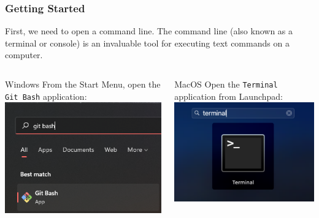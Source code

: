 \begin{frame}
    \frametitle{Getting Started}

    First, we need to open a command line. The command line (also known as a terminal or console) is
    an invaluable tool for executing text commands on a computer.
    \medskip
    
    \begin{columns}
        \begin{column}{.45\textwidth}
            \begin{block}{Windows}
                From the Start Menu, open the \texttt{Git Bash} application:
                \includegraphics[width=\textwidth]{images/windows_gitbash.png}
            \end{block}
        \end{column}

        \begin{column}{.45\textwidth}
            \begin{block}{MacOS}
                Open the \texttt{Terminal} application from Launchpad:
                \includegraphics[width=\textwidth]{images/macos_terminal.png}
            \end{block}
        \end{column}
    \end{columns}
\end{frame}